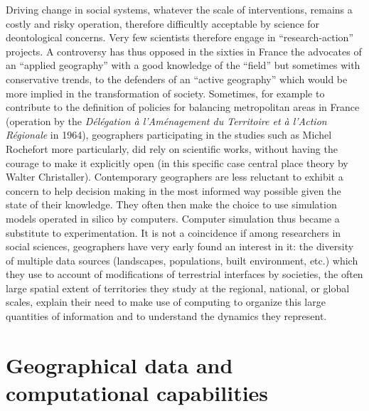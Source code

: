 \documentclass[10pt]{article}
\begin{document}
Driving change in social systems, whatever the scale of interventions, remains a costly and risky operation, therefore difficultly acceptable by science for deontological concerns. Very few scientists therefore engage in ``research-action'' projects. A controversy has thus opposed in the sixties in France the advocates of an ``applied geography'' with a good knowledge of the ``field'' but sometimes with conservative trends, to the defenders of an ``active geography'' which would be more implied in the transformation of society. Sometimes, for example to contribute to the definition of policies for balancing metropolitan areas in France (operation by the \emph{Délégation à l’Aménagement du Territoire et à l’Action Régionale} in 1964), geographers participating in the studies such as Michel Rochefort more particularly, did rely on scientific works, without having the courage to make it explicitly open (in this specific case central place theory by Walter Christaller). Contemporary geographers are less reluctant to exhibit a concern to help decision making in the most informed way possible given the state of their knowledge. They often then make the choice to use simulation models operated in silico by computers. Computer simulation thus became a substitute to experimentation. It is not a coincidence if among researchers in social sciences, geographers have very early found an interest in it: the diversity of multiple data sources (landscapes, populations, built environment, etc.) which they use to account of modifications of terrestrial interfaces by societies, the often large spatial extent of territories they study at the regional, national, or global scales, explain their need to make use of computing to organize this large quantities of information and to understand the dynamics they represent.



\section{Geographical data and computational capabilities}
\end{document}

